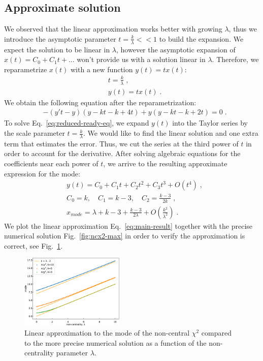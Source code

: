 \documentclass[final,5p,twocolumn,times,authoryear]{elsarticle}
\begin{document}
\subsection{Approximate solution}
We observed that the linear approximation works better with growing $\lambda$, thus we introduce the asymptotic parameter $t = \frac{k}{\lambda} << 1$ to build the expansion. We expect the solution to be linear in $\lambda$, however the asymptotic expansion of $x(t) = C_0 + C_1 t + ...$ won't provide us with a solution linear in $\lambda$. Therefore, we reparametrize $x(t)$ with a new function $y(t) = t x(t)$:
%
\begin{align}
    &t = \frac{k}{\lambda}\;,\label{eq:asymp-scale} \\
    &y(t) = t x(t)\;.
\end{align}
%
We obtain the following equation after the reparametrization:
%
\begin{align}
   &-(y' t - y) (y - kt - k + 4t) + y (y - kt - k + 2t) = 0\label{eq:reduced-ready-eq}\;.
\end{align}
%
To solve Eq.~\ref{eq:reduced-ready-eq}, we expand $y(t)$ into the Taylor series by the scale parameter $t = \frac{k}{\lambda}$. We would like to find the linear solution and one extra term that estimates the error. Thus, we cut the series at the third power of $t$ in order to account for the derivative. After solving algebraic equations for the coefficients near each power of $t$, we arrive to the resulting approximate expression for the mode:
%
\begin{align}
    &y(t) = C_0 + C_1 t + C_2 t^2 + C_3 t^3 + O(t^4)\;, \\
    &C_0 = k, \quad C_1 = k-3, \quad C_2 = \frac{k-3}{2k}\;,\label{eq:taylor-coef-sols}\\
    &\boxed{x_{mode} = \lambda + k - 3 + \frac{k-3}{2 \lambda} + O\left(\frac{k^2}{\lambda^2}\right)} \label{eq:main-result}\;.
\end{align}
%
We plot the linear approximation Eq.~\ref{eq:main-result} together with the precise numerical solution Fig.~\ref{fig:ncx2-max} in order to verify the approximation is correct, see Fig.~\ref{fig:ncx2-vs-approx}.

\begin{figure}[h]
	\centering
 	\includegraphics[width=0.44\textwidth]{ncx2-vs-approx.eps}
	\caption{Linear approximation to the mode of the non-central $\chi^2$ compared to the more precise numerical solution as a function of the non-centrality parameter $\lambda$.}\label{fig:ncx2-vs-approx}
\end{figure}
\end{document}
